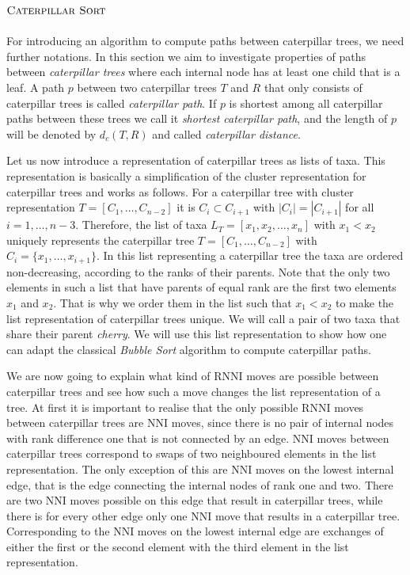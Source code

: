 \documentclass{amsart}
\newcommand{\nni}{\mathrm{NNI}}
\newcommand{\rnni}{\mathrm{RNNI}}
\newcommand{\csort}{\textsc{Caterpillar Sort}}
\begin{document}
\subsection{$\csort$}
\label{section:alg_csort}


For introducing an algorithm to compute paths between caterpillar trees, we need further notations.
In this section we aim to investigate properties of paths between \emph{caterpillar trees} where each internal node has at least one child that is a leaf.
A path $p$ between two caterpillar trees $T$ and $R$ that only consists of caterpillar trees is called \emph{caterpillar path}.
If $p$ is shortest among all caterpillar paths between these trees we call it \emph{shortest caterpillar path}, and the length of $p$ will be denoted by $d_c(T,R)$ and called \emph{caterpillar distance}.

Let us now introduce a representation of caterpillar trees as lists of taxa.
This representation is basically a simplification of the cluster representation for caterpillar trees and works as follows.
For a caterpillar tree with cluster representation $T = [C_1, \ldots, C_{n-2}]$ it is $C_i \subset C_{i+1}$ with $|C_i| = |C_{i+1}|$ for all $i = 1, \ldots, n-3$.
Therefore, the list of taxa $L_T = [x_1, x_2, \ldots, x_n]$ with $x_1<x_2$ uniquely represents the caterpillar tree $T = [C_1, \ldots, C_{n-2}]$ with $C_i = \{x_1, \ldots, x_{i+1}\}$.
In this list representing a caterpillar tree the taxa are ordered non-decreasing, according to the ranks of their parents.
Note that the only two elements in such a list that have parents of equal rank are the first two elements $x_1$ and $x_2$.
That is why we order them in the list such that $x_1 < x_2$ to make the list representation of caterpillar trees unique.
We will call a pair of two taxa that share their parent \emph{cherry}.
We will use this list representation to show how one can adapt the classical \emph{Bubble Sort} algorithm \autocite{Knuth1997-pi} to compute caterpillar paths.

We are now going to explain what kind of $\rnni$ moves are possible between caterpillar trees and see how such a move changes the list representation of a tree.
At first it is important to realise that the only possible $\rnni$ moves between caterpillar trees are $\nni$ moves, since there is no pair of internal nodes with rank difference one that is not connected by an edge.
$\nni$ moves between caterpillar trees correspond to swaps of two neighboured elements in the list representation.
The only exception of this are $\nni$ moves on the lowest internal edge, that is the edge connecting the internal nodes of rank one and two.
There are two $\nni$ moves possible on this edge that result in caterpillar trees, while there is for every other edge only one $\nni$ move that results in a caterpillar tree.
Corresponding to the $\nni$ moves on the lowest internal edge are exchanges of either the first or the second element with the third element in the list representation.
\end{document}
